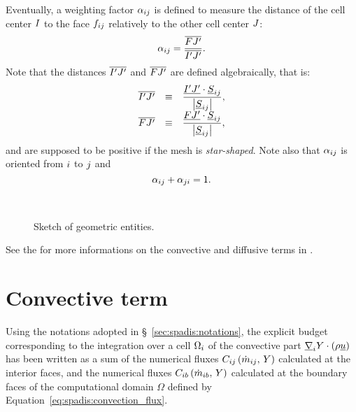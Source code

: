 Eventually, a weighting factor $\alpha_\ij$ is defined to measure the distance of the cell center $\centi$ to the face $\fij$ relatively
to the other cell center $\centj$:
\begin{equation}\label{eq:spadis:pond_def}
\alpha_{\ij}=\dfrac{\overline{\centf \centjp}}{\overline{\centip \centjp}}.
\end{equation}
Note that the distances  $\overline{\centip \centjp}$ and $\overline{\centf \centjp}$ are defined algebraically, that is:
\begin{equation}
\begin{array}{r c l}
\overline{\centip \centjp} & \equiv & \dfrac{\vect{\centip \centjp} \cdot \vect{S}_\ij}{\norm{\vect{S}_\ij}}, \\
\overline{\centf \centjp} & \equiv & \dfrac{\vect{\centf \centjp} \cdot \vect{S}_\ij}{\norm{\vect{S}_\ij}},
\end{array}
\end{equation}
and are supposed to be positive if the mesh is \emph{star-shaped}. Note also that $\alpha_\ij$ is oriented from $\celli$ to $\cellj$ and
%
\begin{equation}
\alpha_\ij + \alpha_\ji = 1.
\end{equation}

\begin{figure}[t]
\centering
\mbox{
 \,
}%
\caption{Sketch of geometric entities.}
\label{fig:sketch_internal_external_faces}
\end{figure}

See the 
for more informations on the convective and diffusive terms in \CS.

\hypertarget{conv-diff}{}

\section{Convective term}\label{sec:spadis:convection}
Using the notations adopted in \S~\ref{sec:spadis:notations},
the explicit budget corresponding to the integration over a cell
$\vol{\celli}$ of the convective part $\grad_\celli \varia \cdot \left(\rho \vect{u} \right) $
has been written as a sum of the
numerical fluxes $C_\ij \left( \dot{m}_\ij , \, \varia \right)$ calculated at the interior faces,
 and the numerical fluxes $C_\ib \left( \dot{m}_\ib , \, \varia \right)$ calculated at the
boundary faces of the computational domain $\Omega$ defined by Equation~\eqref{eq:spadis:convection_flux}.


